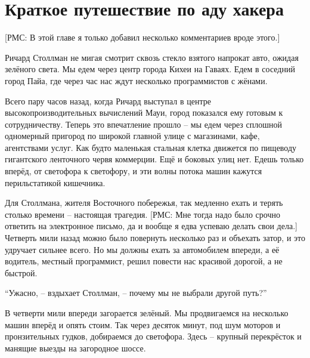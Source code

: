 

\chapter{Краткое путешествие по аду хакера}

[РМС: В этой главе я только добавил несколько комментариев вроде этого.]

Ричард Столлман не мигая смотрит сквозь стекло взятого напрокат авто, ожидая зелёного света. Мы едем через центр города Кихеи на Гаваях. Едем в соседний город Пайа, где через час нас ждут несколько программистов с жёнами.

Всего пару часов назад, когда Ричард выступал в центре высокопроизводительных вычислений Мауи, город показался ему готовым к сотрудничеству. Теперь это впечатление прошло -- мы едем через сплошной одномерный пригород по широкой главной улице с магазинами, кафе, агентствами услуг. Как будто маленькая стальная клетка движется по пищеводу гигантского ленточного червя коммерции. Ещё и боковых улиц нет. Едешь только вперёд, от светофора к светофору, и эти волны потока машин кажутся перильстатикой кишечника.

Для Столлмана, жителя Восточного побережья, так медленно ехать и терять столько времени -- настоящая трагедия. [РМС: Мне тогда надо было срочно ответить на электронное письмо, да и вообще я едва успеваю делать свои дела.] Четверть мили назад можно было повернуть несколько раз и объехать затор, и это удручает сильнее всего. Но мы должны ехать за автомобилем впереди, а её водитель, местный программист, решил повести нас красивой дорогой, а не быстрой.

\enquote{Ужасно, -- вздыхает Столлман, -- почему мы не выбрали другой путь?}

В четверти мили впереди загорается зелёный. Мы продвигаемся на несколько машин вперёд и опять стоим. Так через десяток минут, под шум моторов и пронзительных гудков, добираемся до светофора. Здесь -- крупный перекрёсток и манящие выезды на загородное шоссе.

